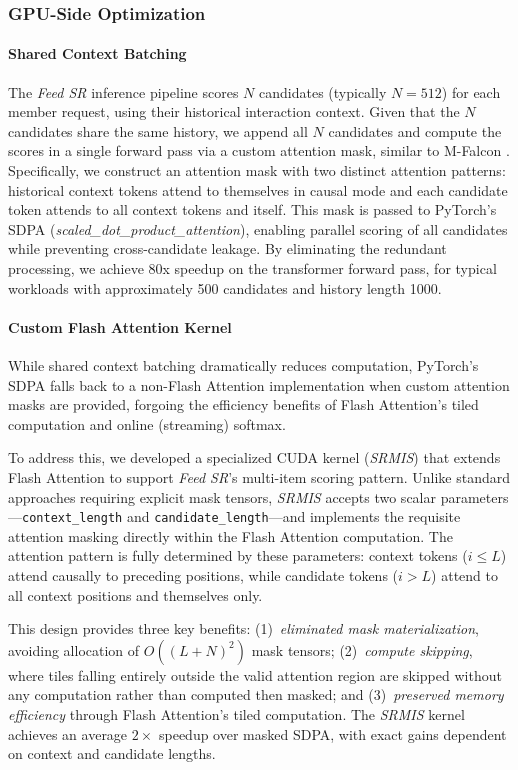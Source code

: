 \documentclass[sigconf]{acmart}
\newcommand{\systemname}{\textit{Feed SR}}
\begin{document}
\subsubsection{GPU-Side Optimization}\label{sec:online-gpu-optimizations}
\paragraph{Shared Context Batching}
The {\systemname} inference pipeline scores $N$ candidates (typically $N=512$) for each member request, using their historical interaction context. Given that the $N$ candidates share the same history, we append all $N$ candidates and compute the scores in a single forward pass via a custom attention mask, similar to M-Falcon \cite{zhai2024actions}. Specifically, we construct an attention mask with two distinct attention patterns: historical context tokens attend to themselves in causal mode and each candidate token attends to all context tokens and itself. This mask is passed to PyTorch's SDPA (\textit{scaled\_dot\_product\_attention}), enabling parallel scoring of all candidates while preventing cross-candidate leakage. By eliminating the redundant processing, we achieve 80x speedup on the transformer forward pass, for typical workloads with approximately 500 candidates and history length 1000.

\paragraph{Custom Flash Attention Kernel} While shared context batching dramatically reduces computation, PyTorch's SDPA falls back to a non-Flash Attention implementation when custom attention masks are provided, forgoing the efficiency benefits of Flash Attention's tiled computation and online (streaming) softmax.

To address this, we developed a specialized CUDA kernel (\textit{SRMIS}) that extends Flash Attention to support {\systemname}'s multi-item scoring  pattern. Unlike standard approaches requiring explicit mask tensors, \textit{SRMIS} accepts two scalar parameters---\texttt{context\_length} and \texttt{candidate\_length}---and implements the requisite attention masking directly within the Flash Attention computation. The attention pattern is fully determined by these parameters: context tokens ($i \leq L$) attend causally to preceding positions, while candidate tokens ($i > L$) attend to all context positions and themselves only.

This design provides three key benefits: (1)~\textit{eliminated mask materialization}, avoiding allocation of $O((L+N)^2)$ mask tensors; (2)~\textit{compute skipping}, where tiles falling entirely outside the valid attention region are skipped without any computation rather than computed then masked; and (3)~\textit{preserved memory efficiency} through Flash Attention's tiled computation. The \textit{SRMIS} kernel achieves an average $2\times$ speedup over masked SDPA, with exact gains dependent on context and candidate lengths.
\end{document}
